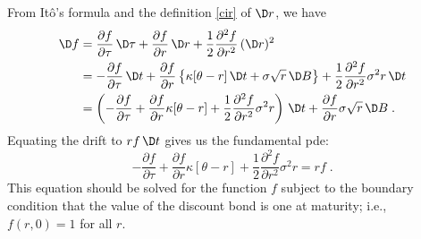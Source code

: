 From It\^o's formula and the definition \eqref{cir} of $\D r$, we have
\begin{align}
\D f &= \frac{\partial f}{\partial \tau}\,\D \tau + \frac{\partial f}{\partial r}\,\D r + \frac{1}{2}\frac{\partial^2 f}{\partial r^2}\,(\D r)^2\notag\\
& = - \frac{\partial f}{\partial \tau} \,\D t + \frac{\partial f}{\partial r}\left\{\kappa [\theta-r]\,\D t+\sigma \sqrt{r}\,\D B\right\} + \frac{1}{2}\frac{\partial^2f}{\partial r^2}\sigma^2r\,\D t\notag\\
&= \left(- \frac{\partial f}{\partial \tau} + \frac{\partial f}{\partial r}\kappa [\theta-r] + \frac{1}{2}\frac{\partial^2f}{\partial r^2}\sigma^2r\right)\,\D t + \frac{\partial f}{\partial r} \sigma\sqrt{r}\,\D B\;.\label{cir10}
\end{align}
Equating the drift to $rf\,\D t$ gives us the fundamental pde: 
\begin{equation}\label{cir2}
- \frac{\partial f}{\partial \tau} + \frac{\partial f}{\partial r}\kappa [\theta-r] + \frac{1}{2}\frac{\partial^2f}{\partial r^2}\sigma^2r = rf\;.
\end{equation}
This equation should be solved for the function $f$ subject to the boundary condition that the value of the discount bond is one at maturity; i.e., $f(r,0)=1$ for all $r$.

